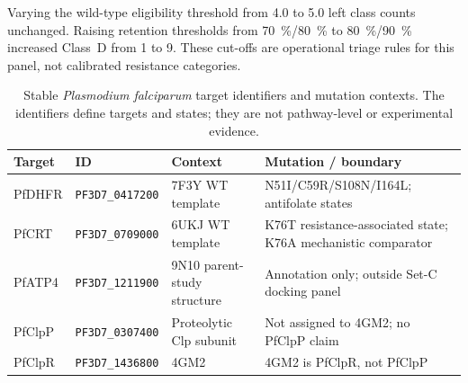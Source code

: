 \documentclass[journal=jcisd8,manuscript=suppinfo,layout=traditional]{achemso}
\begin{document}




\noindent Varying the wild-type eligibility threshold from \qty{4.0}{\kcalmol} to \qty{5.0}{\kcalmol} left class counts unchanged. Raising retention thresholds from \qty{70}{\percent}/\qty{80}{\percent} to \qty{80}{\percent}/\qty{90}{\percent} increased Class~D from 1 to 9. These cut-offs are operational triage rules for this panel, not calibrated resistance categories.













\begin{table}[htbp]
\centering
\scriptsize
\setlength{\tabcolsep}{0pt}
\caption{Stable \textit{Plasmodium falciparum} target identifiers and mutation contexts. The identifiers define targets and states; they are not pathway-level or experimental evidence.}
\label{tab:s5_plasmodb}
\begin{tabularx}{\textwidth}{>{\raggedright\arraybackslash}p{} >{\raggedright\arraybackslash}p{} >{\raggedright\arraybackslash}p{} X}
\toprule
Target & ID & Context & Mutation / boundary \\
\midrule
PfDHFR & \scriptsize\texttt{PF3D7\_0417200}\normalsize & 7F3Y WT template & N51I/C59R/S108N/I164L; antifolate states \\
PfCRT & \scriptsize\texttt{PF3D7\_0709000}\normalsize & 6UKJ WT template & K76T resistance-associated state; K76A mechanistic comparator \\
PfATP4 & \scriptsize\texttt{PF3D7\_1211900}\normalsize & 9N10 parent-study structure & Annotation only; outside Set-C docking panel \\
PfClpP & \scriptsize\texttt{PF3D7\_0307400}\normalsize & Proteolytic Clp subunit & Not assigned to 4GM2; no PfClpP claim \\
PfClpR & \scriptsize\texttt{PF3D7\_1436800}\normalsize & 4GM2 & 4GM2 is PfClpR, not PfClpP \\
\bottomrule
\end{tabularx}
\normalsize
\setlength{\tabcolsep}{6pt}
\end{table}
\end{document}

